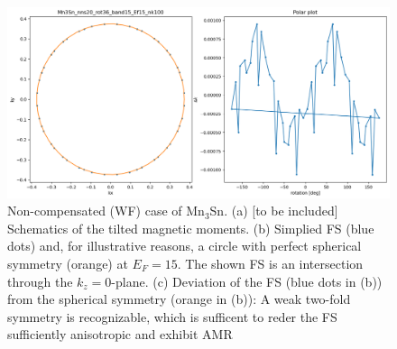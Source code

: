 \documentclass[prb,showpacs,amsmath,amssymb,superscriptaddress,twocolumn,floatfix]{revtex4-1}
\begin{document}
\begin{appendix}
\begin{figure}
        \centering
        \includegraphics[width=\linewidth]{img/Mn3Sn_nns20_rot36_band15_Ef15_nk100}
        \caption{Non-compensated (WF) case of Mn$_3$Sn. {\color{red} (a) [to be included] Schematics of the tilted magnetic moments}. (b) Simplied FS (blue dots) and, for illustrative reasons, a circle with perfect spherical symmetry (orange) at $E_F = 15$. The shown FS is an intersection through the $k_z = 0$-plane. (c) Deviation of the FS (blue dots in (b)) from the spherical symmetry (orange in (b)): A weak two-fold symmetry is recognizable, which is sufficent to reder the FS sufficiently anisotropic and exhibit AMR}
        \label{fig:mn3sn_36deg_FS}
\end{figure}


\end{appendix}

\def\urlprefix{}
\def\url#1{}
\end{document}
